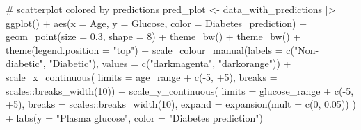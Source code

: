 \documentclass[
  english,
  11pt,
]{article}
\newenvironment{Shaded}{\begin{snugshade}}{\end{snugshade}}
\newcommand{\AttributeTok}[1]{\textcolor[rgb]{0.40,0.45,0.13}{#1}}
\newcommand{\CommentTok}[1]{\textcolor[rgb]{0.37,0.37,0.37}{#1}}
\newcommand{\DecValTok}[1]{\textcolor[rgb]{0.68,0.00,0.00}{#1}}
\newcommand{\FloatTok}[1]{\textcolor[rgb]{0.68,0.00,0.00}{#1}}
\newcommand{\FunctionTok}[1]{\textcolor[rgb]{0.28,0.35,0.67}{#1}}
\newcommand{\NormalTok}[1]{\textcolor[rgb]{0.00,0.23,0.31}{#1}}
\newcommand{\OtherTok}[1]{\textcolor[rgb]{0.00,0.23,0.31}{#1}}
\newcommand{\SpecialCharTok}[1]{\textcolor[rgb]{0.37,0.37,0.37}{#1}}
\newcommand{\StringTok}[1]{\textcolor[rgb]{0.13,0.47,0.30}{#1}}
\begin{document}
\begin{Shaded}
\begin{Highlighting}[]
  \CommentTok{\# scatterplot colored by predictions}
\NormalTok{  pred\_plot }\OtherTok{\textless{}{-}}
\NormalTok{    data\_with\_predictions }\SpecialCharTok{|\textgreater{}}
    \FunctionTok{ggplot}\NormalTok{() }\SpecialCharTok{+}
    \FunctionTok{aes}\NormalTok{(}\AttributeTok{x =}\NormalTok{ Age, }\AttributeTok{y =}\NormalTok{ Glucose, }\AttributeTok{color =}\NormalTok{ Diabetes\_prediction) }\SpecialCharTok{+}
    \FunctionTok{geom\_point}\NormalTok{(}\AttributeTok{size =} \FloatTok{0.3}\NormalTok{, }\AttributeTok{shape =} \DecValTok{8}\NormalTok{) }\SpecialCharTok{+}
    \FunctionTok{theme\_bw}\NormalTok{() }\SpecialCharTok{+}
    \FunctionTok{theme\_bw}\NormalTok{() }\SpecialCharTok{+}
    \FunctionTok{theme}\NormalTok{(}\AttributeTok{legend.position =} \StringTok{"top"}\NormalTok{) }\SpecialCharTok{+}
    \FunctionTok{scale\_colour\_manual}\NormalTok{(}\AttributeTok{labels =} \FunctionTok{c}\NormalTok{(}\StringTok{"Non{-}diabetic"}\NormalTok{, }\StringTok{"Diabetic"}\NormalTok{),}
                        \AttributeTok{values =} \FunctionTok{c}\NormalTok{(}\StringTok{"darkmagenta"}\NormalTok{, }\StringTok{"darkorange"}\NormalTok{)) }\SpecialCharTok{+}
    \FunctionTok{scale\_x\_continuous}\NormalTok{(}
      \AttributeTok{limits =}\NormalTok{ age\_range }\SpecialCharTok{+} \FunctionTok{c}\NormalTok{(}\SpecialCharTok{{-}}\DecValTok{5}\NormalTok{, }\SpecialCharTok{+}\DecValTok{5}\NormalTok{),}
      \AttributeTok{breaks =}\NormalTok{ scales}\SpecialCharTok{::}\FunctionTok{breaks\_width}\NormalTok{(}\DecValTok{10}\NormalTok{)) }\SpecialCharTok{+}
    \FunctionTok{scale\_y\_continuous}\NormalTok{(}
      \AttributeTok{limits =}\NormalTok{ glucose\_range }\SpecialCharTok{+} \FunctionTok{c}\NormalTok{(}\SpecialCharTok{{-}}\DecValTok{5}\NormalTok{, }\SpecialCharTok{+}\DecValTok{5}\NormalTok{),}
      \AttributeTok{breaks =}\NormalTok{ scales}\SpecialCharTok{::}\FunctionTok{breaks\_width}\NormalTok{(}\DecValTok{10}\NormalTok{),}
      \AttributeTok{expand =} \FunctionTok{expansion}\NormalTok{(}\AttributeTok{mult =} \FunctionTok{c}\NormalTok{(}\DecValTok{0}\NormalTok{, }\FloatTok{0.05}\NormalTok{))}
\NormalTok{    ) }\SpecialCharTok{+}
    \FunctionTok{labs}\NormalTok{(}\AttributeTok{y =} \StringTok{"Plasma glucose"}\NormalTok{, }\AttributeTok{color =} \StringTok{"Diabetes prediction"}\NormalTok{)}


\end{Highlighting}
\end{Shaded}
\end{document}
